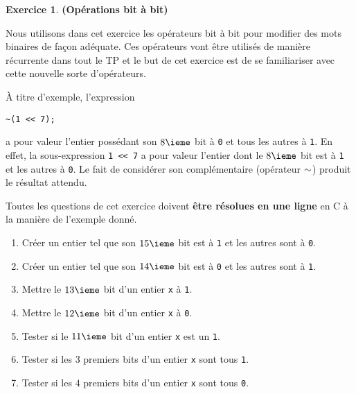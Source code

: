 \documentclass[11pt]{article}
\theoremstyle{definition}
\newtheorem{Exercice}{Exercice}
\begin{document}
\begin{Exercice} {\bf (Opérations bit à bit)}\smallskip
\label{ex:operations}

Nous utilisons dans cet exercice les opérateurs bit à bit pour
modifier des mots binaires de façon adéquate. Ces opérateurs vont être
utilisés de manière récurrente dans tout le TP et le but de cet exercice
est de se familiariser avec cette nouvelle sorte d'opérateurs.
\smallskip

À titre d'exemple, l'expression
\begin{lstlisting}
~(1 << 7);
\end{lstlisting}
a pour valeur l'entier possédant son $8\ieme$ bit à {\tt 0} et tous les
autres à {\tt 1}. En effet, la sous-expression {\tt 1 << 7} a pour valeur
l'entier dont le $8\ieme$ bit est à {\tt 1} et les autres à {\tt 0}. Le
fait de considérer son complémentaire (opérateur ${\tt \sim}$) produit
le résultat attendu.
\smallskip

Toutes les questions de cet exercice doivent {\bf être résolues en une ligne}
en {\sf C} à la manière de l'exemple donné.
\begin{enumerate}
    \item Créer un entier tel que son $15\ieme$ bit est à {\tt 1} et les
    autres sont à {\tt 0}.
    \smallskip

    \item Créer un entier tel que son $14\ieme$ bit est à {\tt 0} et les
    autres sont à {\tt 1}.
    \smallskip

    \item Mettre le $13\ieme$ bit d'un entier {\tt x} à {\tt 1}.
    \smallskip

    \item Mettre le $12\ieme$ bit d'un entier {\tt x} à {\tt 0}.
    \smallskip

    \item Tester si le $11\ieme$ bit d'un entier {\tt x} est un {\tt 1}.
    \smallskip

    \item Tester si les $3$ premiers bits d'un entier {\tt x} sont tous
    {\tt 1}.
    \smallskip

    \item Tester si les $4$ premiers bits d'un entier {\tt x} sont tous
    {\tt 0}.
    \smallskip


\end{enumerate}
\end{Exercice}
\end{document}
